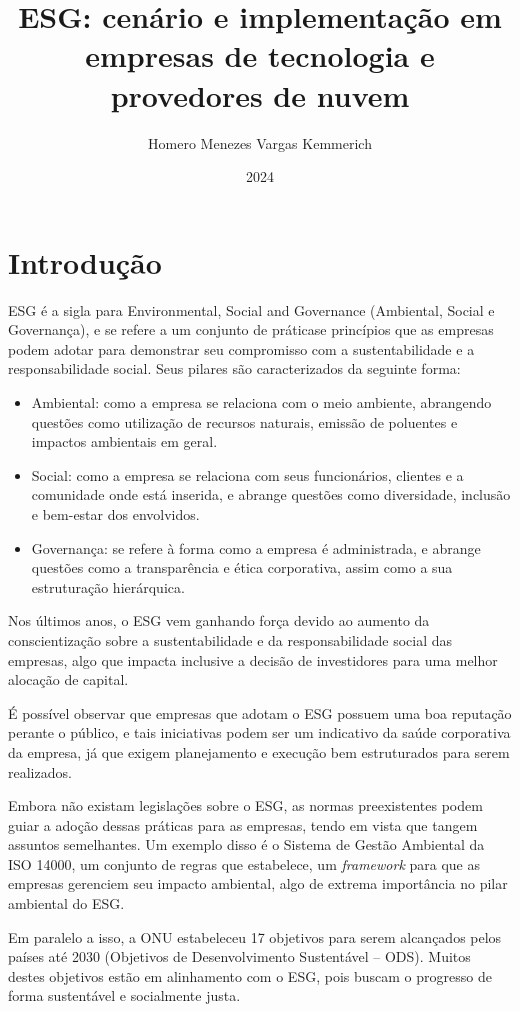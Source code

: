 \documentclass[12pt]{article}
\title{ESG: cenário e implementação em empresas de tecnologia e provedores de nuvem}
\author{Homero Menezes Vargas Kemmerich}
\date{2024}
\begin{document}
	\maketitle
	
	\section*{Introdução}
	ESG é a sigla para Environmental, Social and Governance (Ambiental, Social e Governança), e se refere a um conjunto de práticase princípios que as empresas podem adotar para demonstrar seu compromisso com a sustentabilidade e a responsabilidade social. Seus pilares são caracterizados da seguinte forma:
	\begin{itemize}
		\item Ambiental: como a empresa se relaciona com o meio ambiente, abrangendo questões como utilização de recursos naturais, emissão de poluentes e impactos ambientais em geral.
		\item Social: como a empresa se relaciona com seus funcionários, clientes e a comunidade onde está inserida, e abrange questões como diversidade, inclusão e bem-estar dos envolvidos.
		\item Governança: se refere à forma como a empresa é administrada, e abrange questões como a transparência e ética corporativa, assim como a sua estruturação hierárquica.
	\end{itemize}
	Nos últimos anos, o ESG vem ganhando força devido ao aumento da conscientização sobre a sustentabilidade e da responsabilidade social das empresas, algo que impacta inclusive a decisão de investidores para uma melhor alocação de capital.
	
	É possível observar que empresas que adotam o ESG possuem uma boa reputação perante o público, e tais iniciativas podem ser um indicativo da saúde corporativa da empresa, já que exigem planejamento e execução bem estruturados para serem realizados.
	
	Embora não existam legislações sobre o ESG, as normas preexistentes podem guiar a adoção dessas práticas para as empresas, tendo em vista que tangem assuntos semelhantes. Um exemplo disso é o Sistema de Gestão Ambiental da ISO 14000, um conjunto de regras que estabelece, um \emph{framework} para que as empresas gerenciem seu impacto ambiental, algo de extrema importância no pilar ambiental do ESG.
	
	Em paralelo a isso, a ONU estabeleceu 17 objetivos para serem alcançados pelos países até 2030 (Objetivos de Desenvolvimento Sustentável – ODS). Muitos destes objetivos estão em alinhamento com o ESG, pois buscam o progresso de forma sustentável e socialmente justa.
	
\end{document}
